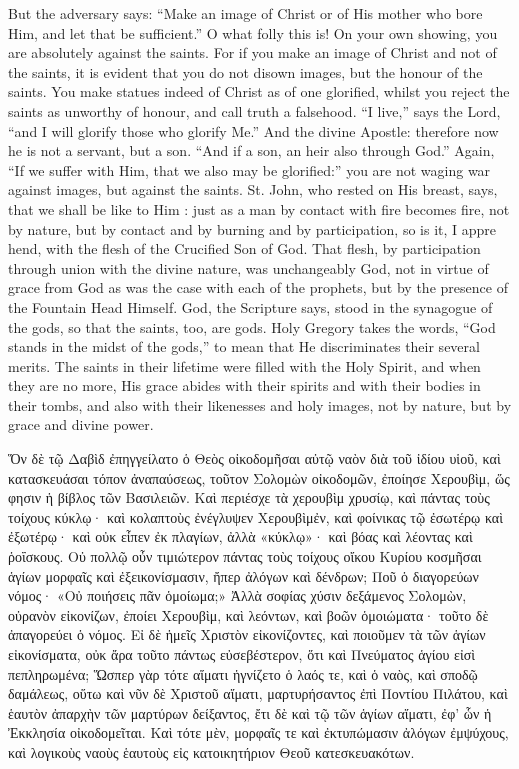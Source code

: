 \documentclass[10pt]{book}
\newcommand{\switchGreek}[1][]{\selectlanguage{polutonikogreek} \switchcolumn*[#1]}
\begin{document}
\begin{paracol}{2}
But the adversary says: ``Make an image of 
Christ or of His mother who bore Him, and let that be sufficient.'' O what 
folly this is! On your own showing, you are 
absolutely against the saints. For if you make 
an image of Christ and not of the saints, it is 
evident that you do not disown images, but 
the honour of the saints. You make statues 
indeed of Christ as of one glorified, whilst you 
reject the saints as unworthy of honour, and 
call truth a falsehood. ``I live,'' says the Lord, 
``and I will glorify those who glorify Me.'' 
And the divine Apostle: therefore now he is 
not a servant, but a son. ``And if a son, an 
heir also through God.'' Again, ``If we suffer 
with Him, that we also may be glorified:'' 
you are not waging war against images, but 
against the saints. St. John, who rested on 
His breast, says, that we shall be like to Him : 
just as a man by contact with fire becomes 
fire, not by nature, but by contact and by 
burning and by participation, so is it, I appre 
hend, with the flesh of the Crucified Son of 
God. That flesh, by participation through 
union with the divine nature, 
was unchangeably God, not in virtue of grace 
from God as was the case with each of the 
prophets, but by the presence of the Fountain 
Head Himself. God, the Scripture says, 
stood in the synagogue of the gods, so that the 
saints, too, are gods. Holy Gregory takes the 
words, ``God stands in the midst of the gods,''
to mean that He discriminates their several 
merits. The saints in their lifetime were 
filled with the Holy Spirit, and when they are 
no more, His grace abides with their spirits 
and with their bodies in their tombs, and also 
with their likenesses and holy images, not by 
nature, but by grace and divine power. 

\switchGreek

Ὅν δὲ τῷ Δαβὶδ ἐπηγγείλατο ὁ Θεὸς οἰκοδομῆσαι αὐτῷ ναὸν διὰ τοῦ ἰδίου υἱοῦ, καὶ κατασκευάσαι τόπον ἀναπαύσεως, τοῦτον Σολομὼν οἰκοδομῶν, ἐποίησε Χερουβὶμ, ὥς φησιν ἡ βίβλος τῶν Βασιλειῶν.
Καὶ περιέσχε τὰ χερουβὶμ χρυσίῳ,
καὶ πάντας τοὺς τοίχους κύκλῳ·
καὶ κολαπτοὺς ἐνέγλυψεν Χερουβὶμἐν,
καὶ φοίνικας τῷ ἐσωτέρῳ καὶ ἐξωτέρῳ·
καὶ οὐκ εἶπεν ἐκ πλαγίων, ἀλλὰ «κύκλῳ»·
καὶ βόας καὶ λέοντας καὶ ῥοΐσκους.
Οὐ πολλῷ οὖν τιμιώτερον πάντας τοὺς τοίχους οἴκου Κυρίου κοσμῆσαι ἁγίων μορφαῖς καὶ ἐξεικονίσμασιν, ἤπερ ἀλόγων καὶ δένδρων; Ποῦ ὁ διαγορεύων νόμος·
«Οὐ ποιήσεις πᾶν ὁμοίωμα;»
Ἀλλὰ σοφίας χύσιν δεξάμενος Σολομὼν, οὐρανὸν εἰκονίζων, ἐποίει Χερουβὶμ, καὶ λεόντων, καὶ βοῶν ὁμοιώματα·
τοῦτο δὲ ἀπαγορεύει ὁ νόμος.
Εἰ δὲ ἡμεῖς Χριστὸν εἰκονίζοντες, καὶ ποιοῦμεν τὰ τῶν ἁγίων εἰκονίσματα, οὐκ ἄρα τοῦτο πάντως εὐσεβέστερον, ὅτι καὶ Πνεύματος ἁγίου εἰσὶ πεπληρωμένα;
Ὥσπερ γὰρ τότε αἵματι ἡγνίζετο ὁ λαός τε, καὶ ὁ ναὸς, καὶ σποδῷ δαμάλεως, οὕτω καὶ νῦν δὲ Χριστοῦ αἵματι, μαρτυρήσαντος ἐπὶ Ποντίου Πιλάτου, καὶ ἑαυτὸν ἀπαρχὴν τῶν μαρτύρων δείξαντος, ἔτι δὲ καὶ τῷ τῶν ἁγίων αἵματι,
ἐφ’ ὧν ἡ Ἐκκλησία οἰκοδομεῖται.
Καὶ τότε μὲν, μορφαῖς τε καὶ ἐκτυπώμασιν ἀλόγων ἐμψύχους, καὶ λογικοὺς ναοὺς ἑαυτοὺς εἰς κατοικητήριον Θεοῦ κατεσκευακότων.


\end{paracol}
\end{document}
